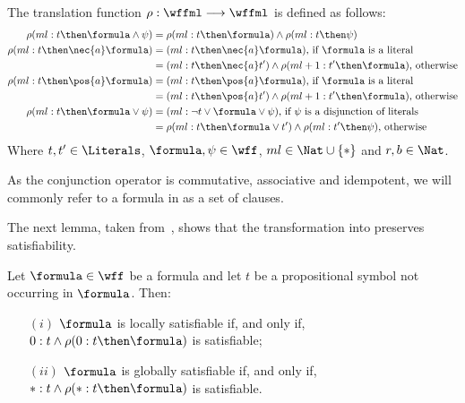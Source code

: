 \begin{definition}
    The translation function $\rho : \wffml \longrightarrow \wffml$ is defined
    as follows:
        \begin{align*}
            \rho(ml : t \then \formula \land \psi) & = \rho(ml : t \then \formula) \land \rho(ml : t \then \psi) \\
            \rho(ml : t \then \nec{a} \formula) & = (ml : t \then \nec{a} \formula) \text{, if \formula\ is a literal}\\
                                                & = (ml : t \then \nec{a} t') \land \rho(ml+1 : t' \then \formula) \text{, otherwise}\\
            \rho(ml : t \then \pos{a} \formula) & = (ml : t \then \pos{a} \formula) \text{, if \formula\ is a literal}\\
                                                & = (ml : t \then \pos{a} t') \land \rho(ml+1 : t' \then \formula) \text{, otherwise}\\
            \rho(ml : t \then \formula \lor \psi) & = (ml : \neg t \lor \formula
            \lor \psi) \text{, if $\psi$ is a disjunction of literals}\\
                                                  & = \rho(ml : t \then \formula \lor t') \land \rho(ml : t' \then \psi) \text{, otherwise}
        \end{align*}
        Where $t, t' \in \Literals$, $\formula, \psi \in \wff$, $ml \in
        \Nat \cup \{*\}$ and $r, b \in \Nat$.
\end{definition}

As the conjunction operator is commutative, associative and idempotent, we will
commonly refer to a formula in  as a set of clauses.

The next lemma, taken from~\cite{nalon2015modal}, shows that the transformation
into  preserves satisfiability.

\begin{lemma}
    Let $\formula \in \wff$ be a formula and let $t$ be a propositional symbol
    not occurring in $\formula$. Then: 
    \begin{enumerate}
        \item[$(i)$] $\formula$ is locally satisfiable if, and only if, $0 : t \land \rho(0 : t \then \formula)$ is satisfiable;
        \item[$(ii)$] $\formula$ is globally satisfiable if, and only if, $* : t \land \rho(* : t \then \formula)$ is satisfiable.
    \end{enumerate}
\end{lemma}

